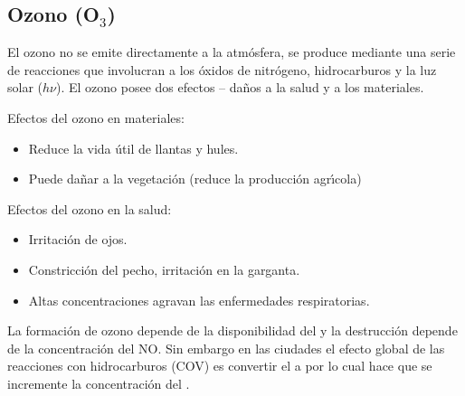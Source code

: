 \subsection{Ozono (O$_3$)}\label{o3_salud}
El ozono no se emite directamente a la atm\'osfera, se produce mediante una serie de reacciones que involucran a los \'oxidos de nitr\'ogeno, hidrocarburos y la luz solar ($h\nu$). El ozono posee dos efectos -- da\~nos a la salud y a los materiales.

Efectos del ozono en materiales:
\begin{itemize}
\item Reduce la vida \'util de llantas y hules.
\item Puede da\~nar a la vegetaci\'on (reduce la producci\'on agr\'{\i}cola)
\end{itemize}
Efectos del ozono en la salud:
\begin{itemize}
\item Irritaci\'on de ojos.
\item Constricci\'on del pecho, irritaci\'on en la garganta.
\item Altas concentraciones agravan las enfermedades respiratorias.
\end{itemize}
%
%
La  formaci\'on de ozono depende de la disponibilidad del   y la destrucci\'on depende de la concentraci\'on del NO. Sin embargo en las ciudades el efecto global de las reacciones con hidrocarburos (COV) es convertir el  a  por lo cual hace que se incremente la concentración del .

